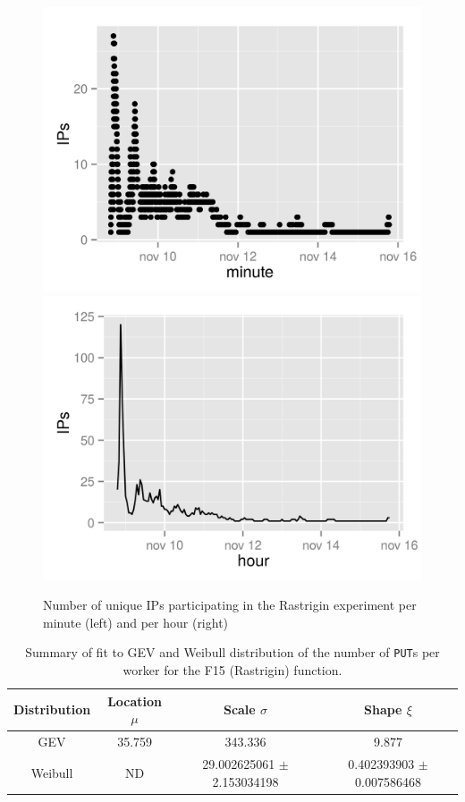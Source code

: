 \documentclass[journal,onecolumn]{IEEEtran}
\begin{document}
%
%
\begin{figure}[!htb]
\centering
\includegraphics[width=0.49\linewidth]{rastrigin-IPs.png}
\includegraphics[width=0.49\linewidth]{rastrigin-IPs-hour.png}
\caption{Number of unique IPs participating in the Rastrigin
  experiment per minute (left) and per hour (right)} 
\label{fig:ips:rastrigin}
\end{figure}
%
\begin{table}
\caption{Summary of fit to GEV and Weibull distribution of
  the number of {\tt PUT}s per worker for the F15 (Rastrigin) function. \label{tab:puts:ww:f15}}
\begin{center}
\begin{tabular}{cccc}
\hline
Distribution & Location $\mu$ & Scale $\sigma$ & Shape $\xi$ \\
\hline
GEV & 35.759  &  343.336   & 9.877 \\
Weibull & ND & 29.002625061 $\pm$ 2.153034198  & 0.402393903 $\pm$ 0.007586468 \\
\hline
\end{tabular}
\end{center}
\end{table}
%
\end{document}
